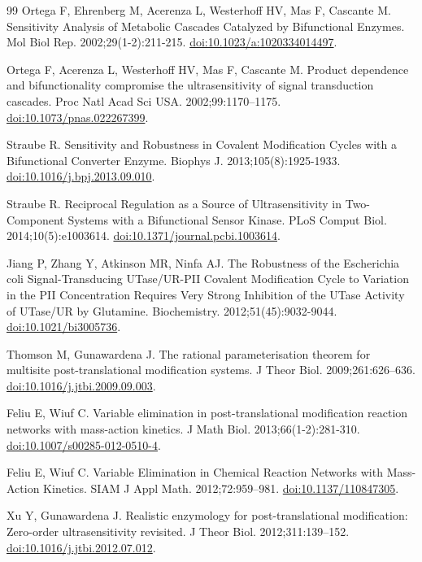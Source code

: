 \documentclass[10pt,letterpaper]{article}
\begin{document}
\begin{thebibliography}{99}
Ortega F, Ehrenberg M, Acerenza L, Westerhoff HV, Mas F, Cascante M. Sensitivity Analysis of Metabolic Cascades Catalyzed by Bifunctional Enzymes. Mol Biol Rep. 2002;29(1-2):211-215. \href{https://doi.org/10.1023/a:1020334014497}{doi:10.1023/a:1020334014497}.

Ortega F, Acerenza L, Westerhoff HV, Mas F, Cascante M. Product dependence and bifunctionality compromise the ultrasensitivity of signal transduction cascades. Proc Natl Acad Sci USA. 2002;99:1170--1175. \href{https://doi.org/10.1073/pnas.022267399}{doi:10.1073/pnas.022267399}.

Straube R. Sensitivity and Robustness in Covalent Modification Cycles with a Bifunctional Converter Enzyme. Biophys J. 2013;105(8):1925-1933. \href{https://doi.org/10.1016/j.bpj.2013.09.010}{doi:10.1016/j.bpj.2013.09.010}.

Straube R. Reciprocal Regulation as a Source of Ultrasensitivity in Two-Component Systems with a Bifunctional Sensor Kinase. PLoS Comput Biol. 2014;10(5):e1003614. \href{https://doi.org/10.1371/journal.pcbi.1003614}{doi:10.1371/journal.pcbi.1003614}.

Jiang P, Zhang Y, Atkinson MR, Ninfa AJ. The Robustness of the Escherichia coli Signal-Transducing UTase/UR-PII Covalent Modification Cycle to Variation in the PII Concentration Requires Very Strong Inhibition of the UTase Activity of UTase/UR by Glutamine. Biochemistry. 2012;51(45):9032-9044. \href{https://doi.org/10.1021/bi3005736}{doi:10.1021/bi3005736}.

Thomson M, Gunawardena J. The rational parameterisation theorem for multisite post-translational modification systems. J Theor Biol. 2009;261:626--636. \href{https://doi.org/10.1016/j.jtbi.2009.09.003}{doi:10.1016/j.jtbi.2009.09.003}.

Feliu E, Wiuf C. Variable elimination in post-translational modification reaction networks with mass-action kinetics. J Math Biol. 2013;66(1-2):281-310. \href{https://doi.org/10.1007/s00285-012-0510-4}{doi:10.1007/s00285-012-0510-4}.

Feliu E, Wiuf C. Variable Elimination in Chemical Reaction Networks with Mass-Action Kinetics. SIAM J Appl Math. 2012;72:959--981. \href{https://doi.org/10.1137/110847305}{doi:10.1137/110847305}.

Xu Y, Gunawardena J. Realistic enzymology for post-translational modification: Zero-order ultrasensitivity revisited. J Theor Biol. 2012;311:139--152. \href{https://doi.org/10.1016/j.jtbi.2012.07.012}{doi:10.1016/j.jtbi.2012.07.012}.


\end{thebibliography}
\end{document}
